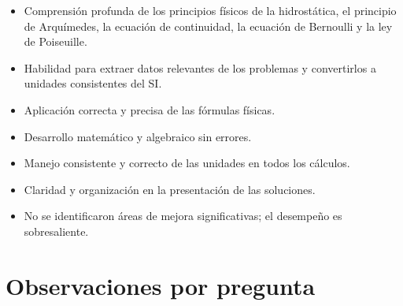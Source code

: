 \documentclass[11pt,a4paper]{article}
\begin{document}
\vspace{4pt}
\begin{minipage}[t]{0.48\linewidth}
  \begin{tcolorbox}[cajaFortaleza, title={Fortalezas}]
\begin{itemize}[leftmargin=1.5em, itemsep=2pt]
  \item Comprensión profunda de los principios físicos de la hidrostática, el principio de Arquímedes, la ecuación de continuidad, la ecuación de Bernoulli y la ley de Poiseuille.
  \item Habilidad para extraer datos relevantes de los problemas y convertirlos a unidades consistentes del SI.
  \item Aplicación correcta y precisa de las fórmulas físicas.
  \item Desarrollo matemático y algebraico sin errores.
  \item Manejo consistente y correcto de las unidades en todos los cálculos.
  \item Claridad y organización en la presentación de las soluciones.
\end{itemize}
  \end{tcolorbox}
\end{minipage}
\hfill
\begin{minipage}[t]{0.48\linewidth}
  \begin{tcolorbox}[cajaMejora, title={Areas de mejora}]
\begin{itemize}[leftmargin=1.5em, itemsep=2pt]
  \item No se identificaron áreas de mejora significativas; el desempeño es sobresaliente.
\end{itemize}
  \end{tcolorbox}
\end{minipage}

\section*{Observaciones por pregunta}
\end{document}
